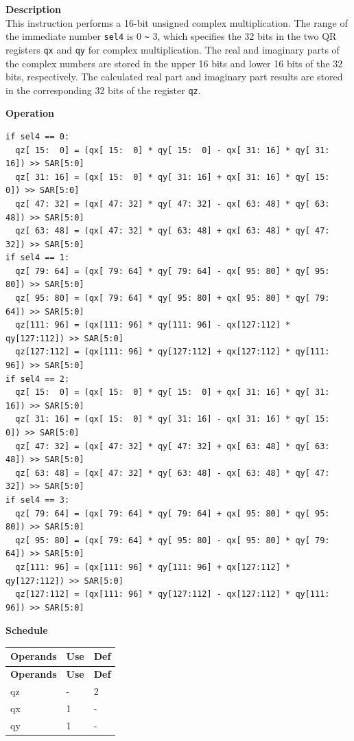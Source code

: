 \textbf{Description}\\
This instruction performs a 16-bit unsigned complex multiplication. The range of the immediate number \lstinline{sel4} is 0 \verb+~+ 3, which specifies the 32 bits in the two QR registers \lstinline{qx} and \lstinline{qy} for complex multiplication. The real and imaginary parts of the complex numbers are stored in the upper 16 bits and lower 16 bits of the 32 bits, respectively. The calculated real part and imaginary part results are stored in the corresponding 32 bits of the register \lstinline{qz}.

\textbf{Operation}\\
\begin{lstlisting}
if sel4 == 0:
  qz[ 15:  0] = (qx[ 15:  0] * qy[ 15:  0] - qx[ 31: 16] * qy[ 31: 16]) >> SAR[5:0]
  qz[ 31: 16] = (qx[ 15:  0] * qy[ 31: 16] + qx[ 31: 16] * qy[ 15:  0]) >> SAR[5:0]
  qz[ 47: 32] = (qx[ 47: 32] * qy[ 47: 32] - qx[ 63: 48] * qy[ 63: 48]) >> SAR[5:0]
  qz[ 63: 48] = (qx[ 47: 32] * qy[ 63: 48] + qx[ 63: 48] * qy[ 47: 32]) >> SAR[5:0]
if sel4 == 1:
  qz[ 79: 64] = (qx[ 79: 64] * qy[ 79: 64] - qx[ 95: 80] * qy[ 95: 80]) >> SAR[5:0]
  qz[ 95: 80] = (qx[ 79: 64] * qy[ 95: 80] + qx[ 95: 80] * qy[ 79: 64]) >> SAR[5:0]
  qz[111: 96] = (qx[111: 96] * qy[111: 96] - qx[127:112] * qy[127:112]) >> SAR[5:0]
  qz[127:112] = (qx[111: 96] * qy[127:112] + qx[127:112] * qy[111: 96]) >> SAR[5:0]
if sel4 == 2:
  qz[ 15:  0] = (qx[ 15:  0] * qy[ 15:  0] + qx[ 31: 16] * qy[ 31: 16]) >> SAR[5:0]
  qz[ 31: 16] = (qx[ 15:  0] * qy[ 31: 16] - qx[ 31: 16] * qy[ 15:  0]) >> SAR[5:0]
  qz[ 47: 32] = (qx[ 47: 32] * qy[ 47: 32] + qx[ 63: 48] * qy[ 63: 48]) >> SAR[5:0]
  qz[ 63: 48] = (qx[ 47: 32] * qy[ 63: 48] - qx[ 63: 48] * qy[ 47: 32]) >> SAR[5:0]
if sel4 == 3:
  qz[ 79: 64] = (qx[ 79: 64] * qy[ 79: 64] + qx[ 95: 80] * qy[ 95: 80]) >> SAR[5:0]
  qz[ 95: 80] = (qx[ 79: 64] * qy[ 95: 80] - qx[ 95: 80] * qy[ 79: 64]) >> SAR[5:0]
  qz[111: 96] = (qx[111: 96] * qy[111: 96] + qx[127:112] * qy[127:112]) >> SAR[5:0]
  qz[127:112] = (qx[111: 96] * qy[127:112] - qx[127:112] * qy[111: 96]) >> SAR[5:0]
\end{lstlisting}



\textbf{Schedule}\\
\begin{longtable}[c]{|l|l|l|}
    \hline
    \rowcolor{lightgray}
    \textbf{Operands} & \textbf{Use} & \textbf{Def} \\\hline
    \endfirsthead
    \hline
    \rowcolor{lightgray}
     \textbf{Operands} & \textbf{Use} & \textbf{Def} \\\hline
    \endhead
    \hline
    \endfoot


    qz & - & 2 \\\hline
     qx & 1 & - \\\hline
     qy & 1 & -

\end{longtable}

